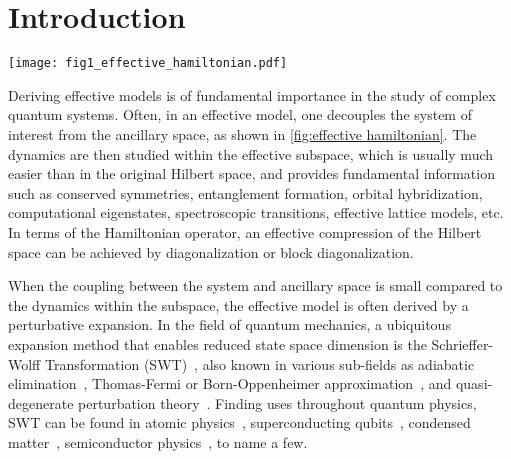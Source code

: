 \documentclass[%
 reprint,
 amsmath,amssymb,
 aps,
pra,
noeprint,
superscriptaddress,
]{revtex4-2}
\begin{document}
\setcounter{tocdepth}{3}
\tableofcontents


\section{Introduction}

\begin{figure*}[t]
\centering
\texttt{[image: fig1\_effective\_hamiltonian.pdf]}
\caption{Illustration of generating an effective Hamiltonian model from a given physical model. The left-hand side shows the physical system composed of several different quantum subsystems and possible coupling among them. External controls may also exist and drive the system dynamics.
The methods introduced in this article (NPAD and RSWT) can be used to compute the effective model (right-hand side) where undesired interactions are effectively removed (block A) and engineered couplings are enhanced (block B). The dynamics can then be studied in the computational subspace.
}
\label{fig:effective hamiltonian}
\end{figure*}

Deriving effective models is of fundamental importance in the study of complex quantum systems. Often, in an effective model, one decouples the system of interest from the ancillary space, as shown in \cref{fig:effective hamiltonian}. The dynamics are then studied within the effective subspace, which is usually much easier than in the original Hilbert space, and provides fundamental information such as conserved symmetries, entanglement formation, orbital hybridization, computational eigenstates, spectroscopic transitions, effective lattice models, etc. In terms of the Hamiltonian operator, an effective compression of the Hilbert space can be achieved by diagonalization or block diagonalization.

When the coupling between the system and ancillary space is small compared to the dynamics within the subspace, the effective model is often derived by a perturbative expansion. In the field of quantum mechanics, a ubiquitous expansion method that enables reduced state space dimension is the Schrieffer-Wolff Transformation (SWT)~\cite{Schrieffer1966,Bravyi2011}, also known in various sub-fields as adiabatic elimination~\cite{Brion2007}, Thomas-Fermi or Born-Oppenheimer approximation~\cite{Lieb1977,born1927}, and quasi-degenerate perturbation theory~\cite{Suzuki1984}. Finding uses throughout quantum physics, SWT can be found in atomic physics~\cite{Brion2007}, superconducting qubits~\cite{Magesan2020,Malekakhlagh2020}, condensed matter~\cite{Bravyi2011}, semiconductor physics~\cite{Romhanyi2015},  to name a few.
\end{document}
